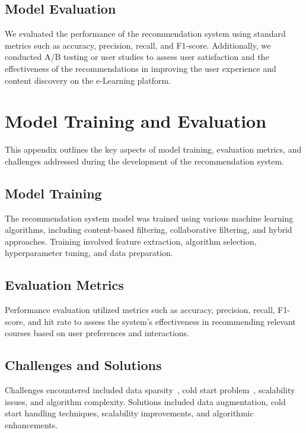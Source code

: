 \section{Model Evaluation}

We evaluated the performance of the recommendation system using standard 
metrics such as accuracy, precision, recall, and F1-score. Additionally, 
we conducted A/B testing or user studies to assess user satisfaction and 
the effectiveness of the recommendations in improving the user experience 
and content discovery on the e-Learning platform.

\chapter{Model Training and Evaluation}

This appendix outlines the key aspects of model training, evaluation metrics, and challenges addressed during the development of the recommendation system.

\section{Model Training}

The recommendation system model was trained using various machine learning algorithms, including content-based filtering, collaborative filtering, and hybrid approaches. Training involved feature extraction, algorithm selection, hyperparameter tuning, and data preparation.

\section{Evaluation Metrics}

Performance evaluation utilized metrics such as accuracy, precision, recall, F1-score, and hit rate to assess the system's effectiveness in recommending relevant courses based on user preferences and interactions.

\section{Challenges and Solutions}

Challenges encountered included data sparsity~\cite{Tian2019}, cold start problem~\cite{Gope2017}, scalability issues, and algorithm complexity. Solutions included data augmentation, cold start handling techniques, scalability improvements, and algorithmic enhancements.